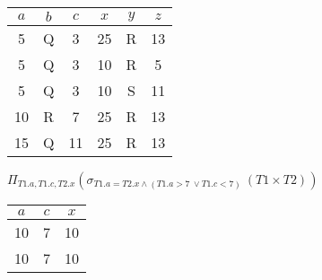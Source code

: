 \begin{problem}
\begin{enumalph}
\begin{Answer}
      \centering
      \begin{tabular}{ c c c c c c }
        \midrule
        $a$ & $b$ & $c$ & $x$ & $y$ & $z$ \\
        \midrule
        5 & Q & 3 & 25 & R & 13 \\
        \midrule
        5 & Q & 3 & 10 & R & 5 \\
        \midrule
        5 & Q & 3 & 10 & S & 11 \\
        \midrule
        10 & R & 7 & 25 & R & 13 \\
        \midrule
        15 & Q & 11 & 25 & R & 13 \\
        \midrule
      \end{tabular}
    \end{Answer}
    \item $\Pi_{T1.a, T1.c, T2.x}(\sigma_{T1.a = T2.x \land (T1.a > 7\ \lor T1.c < 7)}\ (T1 \times T2))$
  
    \begin{Answer}
      \centering
      \begin{tabular}{ c c c }
        \midrule
        $a$ & $c$ & $x$ \\
        \midrule
        10 & 7 & 10 \\
        \midrule
        10 & 7 & 10 \\
        \midrule
      \end{tabular}
    \end{Answer}
  \end{enumalph}
  
\end{problem}


